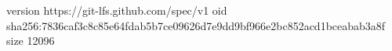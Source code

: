 version https://git-lfs.github.com/spec/v1
oid sha256:7836caf3c8c85e64fdab5b7ce09626d7e9dd9bf966e2bc852acd1bceabab3a8f
size 12096
